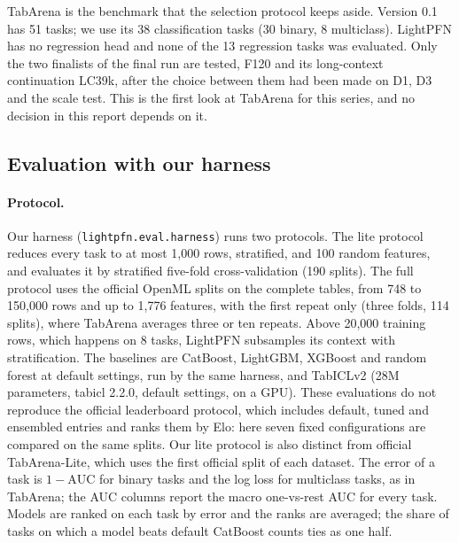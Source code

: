 \documentclass[11pt]{article}
\begin{document}
TabArena \cite{tabarena} is the benchmark that the selection protocol keeps aside. Version 0.1 has 51 tasks; we
use its 38 classification tasks (30 binary, 8 multiclass). LightPFN has no regression head and none of the 13
regression tasks was evaluated. Only the two finalists of the final run are tested, F120 and its long-context
continuation LC39k, after the choice between them had been made on D1, D3 and the scale test. This is the first
look at TabArena for this series, and no decision in this report depends on it.

\subsection{Evaluation with our harness}

\paragraph{Protocol.} Our harness (\texttt{lightpfn.eval.harness}) runs two protocols. The lite protocol reduces
every task to at most 1,000 rows, stratified, and 100 random features, and evaluates it by stratified five-fold
cross-validation (190 splits). The full protocol uses the official OpenML splits on the complete tables, from 748
to 150,000 rows and up to 1,776 features, with the first repeat only (three folds, 114 splits), where TabArena
averages three or ten repeats. Above 20,000 training rows, which happens on 8 tasks, LightPFN subsamples its
context with stratification. The baselines are CatBoost, LightGBM, XGBoost and random forest at default settings,
run by the same harness, and TabICLv2 \cite{tabiclv2} (28M parameters, tabicl 2.2.0, default settings, on a GPU).
These evaluations do not reproduce the official leaderboard protocol, which includes default, tuned and
ensembled entries and ranks them by Elo: here seven fixed configurations are compared on the same splits.
Our lite protocol is also distinct from official TabArena-Lite, which uses the first official split of each
dataset. The error of a task is $1-\mathrm{AUC}$ for
binary tasks and the log loss for multiclass tasks, as in TabArena; the AUC columns report the macro one-vs-rest
AUC for every task. Models are ranked on each task by error and the ranks are averaged; the share of tasks on which
a model beats default CatBoost counts ties as one half.
\end{document}
